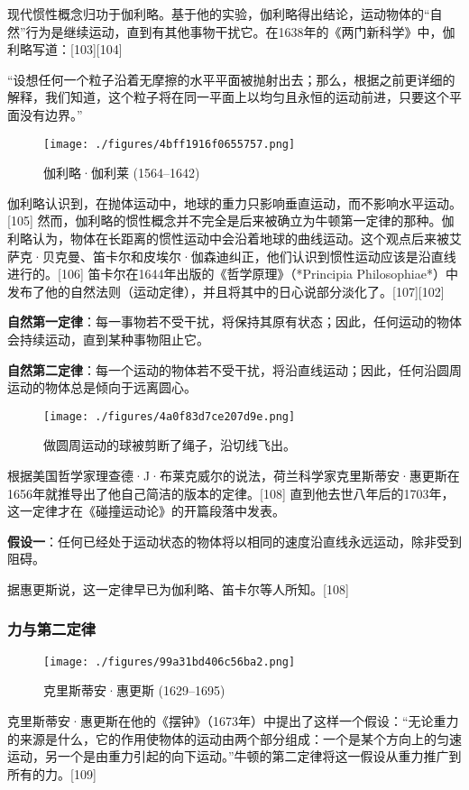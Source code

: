 现代惯性概念归功于伽利略。基于他的实验，伽利略得出结论，运动物体的“自然”行为是继续运动，直到有其他事物干扰它。在1638年的《两门新科学》中，伽利略写道：[103][104]

“设想任何一个粒子沿着无摩擦的水平平面被抛射出去；那么，根据之前更详细的解释，我们知道，这个粒子将在同一平面上以均匀且永恒的运动前进，只要这个平面没有边界。” 
\begin{figure}[ht]
\centering
\texttt{[image: ./figures/4bff1916f0655757.png]}
\caption{伽利略·伽利莱   (1564–1642)} \label{fig_NEW01_18}
\end{figure}
伽利略认识到，在抛体运动中，地球的重力只影响垂直运动，而不影响水平运动。[105] 然而，伽利略的惯性概念并不完全是后来被确立为牛顿第一定律的那种。伽利略认为，物体在长距离的惯性运动中会沿着地球的曲线运动。这个观点后来被艾萨克·贝克曼、笛卡尔和皮埃尔·伽森迪纠正，他们认识到惯性运动应该是沿直线进行的。[106] 笛卡尔在1644年出版的《哲学原理》（*Principia Philosophiae*）中发布了他的自然法则（运动定律），并且将其中的日心说部分淡化了。[107][102]

\textbf{自然第一定律}：每一事物若不受干扰，将保持其原有状态；因此，任何运动的物体会持续运动，直到某种事物阻止它。

\textbf{自然第二定律}：每一个运动的物体若不受干扰，将沿直线运动；因此，任何沿圆周运动的物体总是倾向于远离圆心。
\begin{figure}[ht]
\centering
\texttt{[image: ./figures/4a0f83d7ce207d9e.png]}
\caption{做圆周运动的球被剪断了绳子，沿切线飞出。} \label{fig_NEW01_20}
\end{figure}
根据美国哲学家理查德·J·布莱克威尔的说法，荷兰科学家克里斯蒂安·惠更斯在1656年就推导出了他自己简洁的版本的定律。[108] 直到他去世八年后的1703年，这一定律才在《碰撞运动论》的开篇段落中发表。

\textbf{假设一}：任何已经处于运动状态的物体将以相同的速度沿直线永远运动，除非受到阻碍。

据惠更斯说，这一定律早已为伽利略、笛卡尔等人所知。[108]
\subsubsection{力与第二定律}
\begin{figure}[ht]
\centering
\texttt{[image: ./figures/99a31bd406c56ba2.png]}
\caption{克里斯蒂安·惠更斯   (1629–1695)} \label{fig_NEW01_21}
\end{figure}
克里斯蒂安·惠更斯在他的《摆钟》（1673年）中提出了这样一个假设：“无论重力的来源是什么，它的作用使物体的运动由两个部分组成：一个是某个方向上的匀速运动，另一个是由重力引起的向下运动。”牛顿的第二定律将这一假设从重力推广到所有的力。[109]

